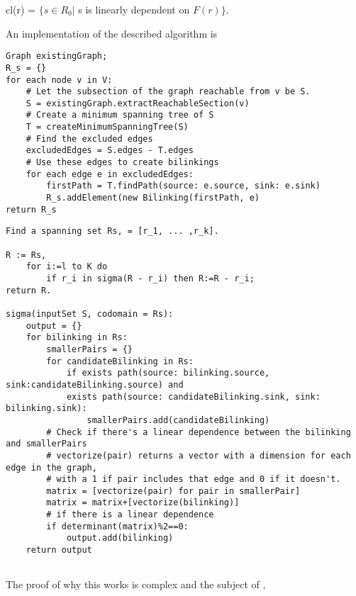\documentclass{article}
\begin{document}
cl(r) = $\{ s\in R_0|$ s is linearly dependent on $F(r) \}$.


An implementation of the described algorithm is

\begin{verbatim}
Graph existingGraph;
R_s = {}
for each node v in V:
    # Let the subsection of the graph reachable from v be S.
    S = existingGraph.extractReachableSection(v)
    # Create a minimum spanning tree of S
    T = createMinimumSpanningTree(S)
    # Find the excluded edges
    excludedEdges = S.edges - T.edges
    # Use these edges to create bilinkings
    for each edge e in excludedEdges:
        firstPath = T.findPath(source: e.source, sink: e.sink)
        R_s.addElement(new Bilinking(firstPath, e)
return R_s
\end{verbatim}

\begin{verbatim}
Find a spanning set Rs, = [r_1, ... ,r_k].

R := Rs,
    for i:=l to K do
        if r_i in sigma(R - r_i) then R:=R - r_i;
return R.

sigma(inputSet S, codomain = Rs):
    output = {}
    for bilinking in Rs:
        smallerPairs = {}
        for candidateBilinking in Rs:
            if exists path(source: bilinking.source, sink:candidateBilinking.source) and
            exists path(source: candidateBilinking.sink, sink: bilinking.sink):
                smallerPairs.add(candidateBilinking)
        # Check if there's a linear dependence between the bilinking and smallerPairs
        # vectorize(pair) returns a vector with a dimension for each edge in the graph,
        # with a 1 if pair includes that edge and 0 if it doesn't.
        matrix = [vectorize(pair) for pair in smallerPair]
        matrix = matrix+[vectorize(bilinking)]
        # if there is a linear dependence
        if determinant(matrix)%2==0:
            output.add(bilinking)
    return output
                
\end{verbatim}

The proof of why this works is complex and the subject of \cite{commutative}, 
\end{document}
